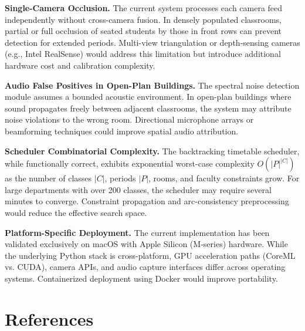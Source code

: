 \documentclass[12pt,a4paper,oneside]{report}
\begin{document}
\textbf{Single-Camera Occlusion.} The current system processes each camera feed independently without cross-camera fusion. In densely populated classrooms, partial or full occlusion of seated students by those in front rows can prevent detection for extended periods. Multi-view triangulation or depth-sensing cameras (e.g., Intel RealSense) would address this limitation but introduce additional hardware cost and calibration complexity.

\textbf{Audio False Positives in Open-Plan Buildings.} The spectral noise detection module assumes a bounded acoustic environment. In open-plan buildings where sound propagates freely between adjacent classrooms, the system may attribute noise violations to the wrong room. Directional microphone arrays or beamforming techniques could improve spatial audio attribution.

\textbf{Scheduler Combinatorial Complexity.} The backtracking timetable scheduler, while functionally correct, exhibits exponential worst-case complexity $O(|P|^{|C|})$ as the number of classes $|C|$, periods $|P|$, rooms, and faculty constraints grow. For large departments with over 200 classes, the scheduler may require several minutes to converge. Constraint propagation and arc-consistency preprocessing would reduce the effective search space.

\textbf{Platform-Specific Deployment.} The current implementation has been validated exclusively on macOS with Apple Silicon (M-series) hardware. While the underlying Python stack is cross-platform, GPU acceleration paths (CoreML vs. CUDA), camera APIs, and audio capture interfaces differ across operating systems. Containerized deployment using Docker would improve portability.

\chapter{References}
\thispagestyle{empty}
\end{document}
